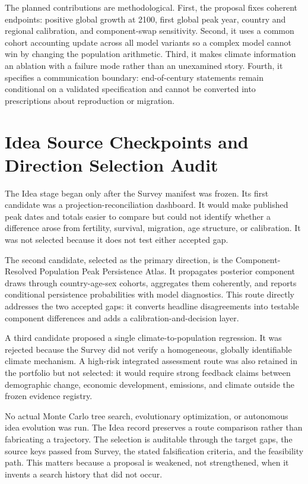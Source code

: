 \documentclass[conference]{IEEEtran}
\begin{document}
The planned contributions are methodological. First, the proposal fixes coherent endpoints: positive global growth at 2100, first global peak year, country and regional calibration, and component-swap sensitivity. Second, it uses a common cohort accounting update across all model variants so a complex model cannot win by changing the population arithmetic. Third, it makes climate information an ablation with a failure mode rather than an unexamined story. Fourth, it specifies a communication boundary: end-of-century statements remain conditional on a validated specification and cannot be converted into prescriptions about reproduction or migration.

\section{Idea Source Checkpoints and Direction Selection Audit}

The Idea stage began only after the Survey manifest was frozen. Its first candidate was a projection-reconciliation dashboard. It would make published peak dates and totals easier to compare but could not identify whether a difference arose from fertility, survival, migration, age structure, or calibration. It was not selected because it does not test either accepted gap.

The second candidate, selected as the primary direction, is the Component-Resolved Population Peak Persistence Atlas. It propagates posterior component draws through country-age-sex cohorts, aggregates them coherently, and reports conditional persistence probabilities with model diagnostics. This route directly addresses the two accepted gaps: it converts headline disagreements into testable component differences and adds a calibration-and-decision layer.

A third candidate proposed a single climate-to-population regression. It was rejected because the Survey did not verify a homogeneous, globally identifiable climate mechanism. A high-risk integrated assessment route was also retained in the portfolio but not selected: it would require strong feedback claims between demographic change, economic development, emissions, and climate outside the frozen evidence registry.

No actual Monte Carlo tree search, evolutionary optimization, or autonomous idea evolution was run. The Idea record preserves a route comparison rather than fabricating a trajectory. The selection is auditable through the target gaps, the source keys passed from Survey, the stated falsification criteria, and the feasibility path. This matters because a proposal is weakened, not strengthened, when it invents a search history that did not occur.
\end{document}
